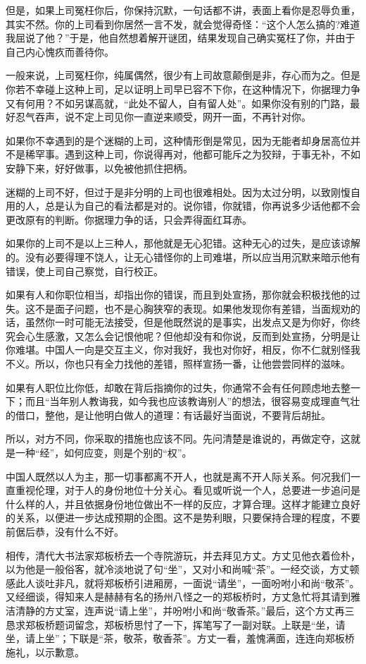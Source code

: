 \documentclass[fontset=fandol, a4paper, 12pt, openright]{ctexbook}
\begin{document}
但是，如果上司冤枉你后，你保持沉默，一句话都不讲，表面上看你是忍辱负重，其实不然。你的上司看到你居然一言不发，就会觉得奇怪：“这个人怎么搞的?难道我屈说了他？”于是，他自然想着解开谜团，结果发现自己确实冤枉了你，并由于自己内心愧疚而善待你。

一般来说，上司冤枉你，纯属偶然，很少有上司故意颠倒是非，存心而为之。但是你若不幸碰上这种上司，足以证明上司早已容不下你，在这种情况下，你据理力争又有何用？不如另谋高就，“此处不留人，自有留人处”。如果你没有别的门路，最好忍气吞声，说不定上司见你一直逆来顺受，网开一面，不再针对你。

如果你不幸遇到的是个迷糊的上司，这种情形倒是常见，因为无能者却身居高位并不是稀罕事。遇到这种上司，你说得再对，他都可能斥之为狡辩，于事无补，不如安静下来，好好做事，以免被他抓住把柄。

迷糊的上司不好，但过于是非分明的上司也很难相处。因为太过分明，以致刚愎自用的人，总是认为自己的看法都是对的。说你错，你就错，你再说多少话他都不会更改原有的判断。你据理力争的话，只会弄得面红耳赤。

如果你的上司不是以上三种人，那他就是无心犯错。这种无心的过失，是应该谅解的。没有必要得理不饶人，让无心错怪你的上司难堪，所以应当用沉默来暗示他有错误，使上司自己察觉，自行校正。

如果有人和你职位相当，却指出你的错误，而且到处宣扬，那你就会积极找他的过失。这不是面子问题，也不是心胸狭窄的表现。如果他发现你有差错，当面规劝的话，虽然你一时可能无法接受，但是他既然说的是事实，出发点又是为你好，你终究会心生感激，又怎么会记恨他呢？但他却没有和你说，反而到处宣扬，分明是让你难堪。中国人一向是交互主义，你对我好，我也对你好，相反，你不仁就别怪我不义。所以，你也只有全力找他的差错，照样宣扬一番，让他尝尝同样的滋味。

如果有人职位比你低，却敢在背后指摘你的过失，你通常不会有任何顾虑地去整一下；而且“当年别人教诲我，如今我也应该教诲别人”的想法，很容易变成理直气壮的借口，整他，是让他明白做人的道理：有话最好当面说，不要背后胡扯。

所以，对方不同，你采取的措施也应该不同。先问清楚是谁说的，再做定夺，这就是一种“经”，如何应变，则是个别的“权”。

中国人既然以人为主，那一切事都离不开人，也就是离不开人际关系。何况我们一直重视伦理，对于人的身份地位十分关心。看见或听说一个人，总要进一步追问是什么样的人，并且依据身份地位做出不一样的反应，才算合理。这样才能建立良好的关系，以便进一步达成预期的企图。这不是势利眼，只要保持合理的程度，不要前倨后恭，没有什么不好。

相传，清代大书法家郑板桥去一个寺院游玩，并去拜见方丈。方丈见他衣着俭朴，以为他是一般俗客，就冷淡地说了句“坐”，又对小和尚喊“茶”。一经交谈，方丈顿感此人谈吐非凡，就将郑板桥引进厢房，一面说“请坐”，一面吩咐小和尚“敬茶”。又经细谈，得知来人是赫赫有名的扬州八怪之一的郑板桥时，方丈急忙将其请到雅洁清静的方丈室，连声说“请上坐”，并吩咐小和尚“敬香茶。”最后，这个方丈再三恳求郑板桥题词留念，郑板桥思忖了一下，挥笔写了一副对联。上联是“坐，请坐，请上坐”；下联是“茶，敬茶，敬香茶”。方丈一看，羞愧满面，连连向郑板桥施礼，以示歉意。
\end{document}

